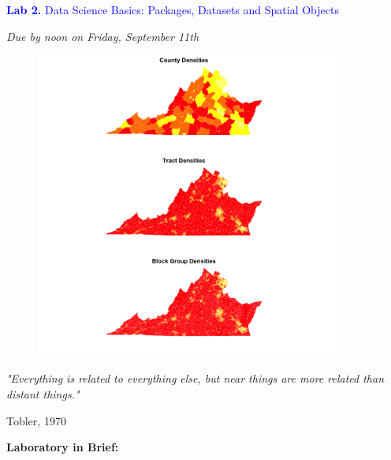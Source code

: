 \documentclass{article}
\begin{document}
\vspace*{.01mm}

\begin{center}

\Large{\textcolor{blue}{\textbf{Lab 2.}  Data Science Basics: Packages, Datasets and Spatial Objects}}

\vspace{4mm}

\textit{Due by noon on Friday, September 11th}\\

\end{center}

\begin{figure}[h!]
\begin{center}
\includegraphics[width=0.9\textwidth]{virginia.png}

\end{center}
\end{figure}

\setlength{\parindent}{0cm}

\large{\textit{"Everything is related to everything else, but near things are more related than distant things."}
\begin{flushright}
Tobler, 1970
\end{flushright}
}


\newpage


\large{\textbf{Laboratory in Brief:}}
\end{document}
